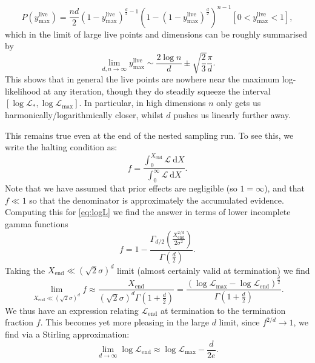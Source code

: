 \documentclass[usenatbib]{mnras}
\begin{document}
\begin{equation}
    P(y_\mathrm{max}^\mathrm{live}) = \frac{nd}{2}(1-y_\mathrm{max}^\mathrm{live})^{\frac{d}{2}-1}\left(1-(1-y_\mathrm{max}^\mathrm{live})^{\frac{d}{2}}\right)^{n-1}[0<y_\mathrm{max}^\mathrm{live}<1],
    \label{eq:Pyhat}
\end{equation}
which in the limit of large live points and dimensions can be roughly summarised by
\begin{equation}\label{eq:ylivemax}
	    \lim_{d,n\to\infty} y_\mathrm{max}^\mathrm{live} \sim \frac{2\log n}{d} \pm \sqrt{\frac{2}{3}}\frac{\pi}{d}.
\end{equation}
This shows that in general the live points are nowhere near the maximum log-likelihood at any iteration, though they do steadily squeeze the interval $[\log\mathcal{L}_*,\log\mathcal{L}_\mathrm{max}]$. In particular, in high dimensions $n$ only gets us harmonically/logarithmically closer, whilst $d$ pushes us linearly further away.
\par
This remains true even at the end of the nested sampling run. To see this, we write the halting condition as:
\begin{equation}
	f = \frac{\int_0^{X_\mathrm{end}} \mathcal{L}\ \mathrm{d}X}{\int_0^\infty \mathcal{L}\ \mathrm{d}X}.
    \label{eq:fint}
\end{equation}
Note that we have assumed that prior effects are negligible (so $1=\infty$), and that $f \ll 1$ so that the denominator is approximately the accumulated evidence. Computing this for \cref{eq:logL} we find the answer in terms of lower incomplete gamma functions
\begin{equation}
    f = 1- \frac{\Gamma_{d/2}\left(\frac{X_\mathrm{end}^{2/d}}{2\sigma^2}\right)}{\Gamma\left(\frac{d}{2}\right)}.
    \label{eq:f}
\end{equation}
Taking the $X_\mathrm{end}\ll (\sqrt{2}\sigma)^d$ limit (almost certainly valid at termination) we find
\begin{equation}
    \lim_{X_\mathrm{end}\ll (\sqrt{2}\sigma)^d} f \approx \frac{X_\mathrm{end}}{(\sqrt{2}\sigma)^d\Gamma(1+\frac{d}{2})} = \frac{(\log\mathcal{L}_\mathrm{max}-\log\mathcal{L}_\mathrm{end})^{\frac{d}{2}}}{\Gamma(1+\frac{d}{2})}.
\end{equation}
We thus have an expression relating $\mathcal{L}_\mathrm{end}$ at termination to the termination fraction $f$. This becomes yet more pleasing in the large $d$ limit, since $f^{2/d}\to 1$, we find via a Stirling approximation:
\begin{equation}
    \lim_{d\to\infty} \log\mathcal{L}_\mathrm{end} \approx \log\mathcal{L}_\mathrm{max} - \frac{d}{2e}.
\end{equation}
\end{document}
